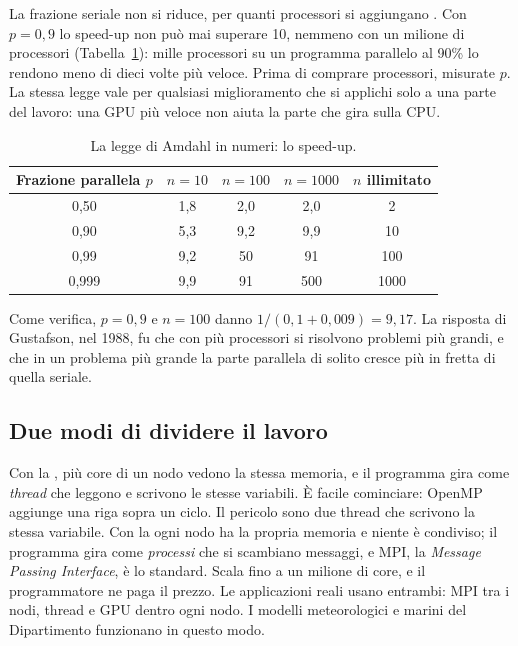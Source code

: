 \smallskip
La frazione seriale non si riduce, per quanti processori si aggiungano
\citep{amdahl1967}. Con $p=0,9$ lo speed-up non può mai superare 10, nemmeno
con un milione di processori (Tabella~\ref{tab:by:amdahl}): mille processori
su un programma parallelo al 90\% lo rendono meno di dieci volte più veloce.
Prima di comprare processori, misurate $p$. La stessa legge vale per qualsiasi
miglioramento che si applichi solo a una parte del lavoro: una GPU più veloce
non aiuta la parte che gira sulla CPU.

\begin{table}[htb]
\centering\small
\caption{La legge di Amdahl in numeri: lo speed-up.}\label{tab:by:amdahl}
\begin{tabular}{@{}ccccc@{}}
\toprule
\textbf{Frazione parallela $p$} & $n=10$ & $n=100$ & $n=1000$ & $n$ illimitato\\
\midrule
0,50 & 1,8 & 2,0 & 2,0 & 2\\
0,90 & 5,3 & 9,2 & 9,9 & 10\\
0,99 & 9,2 & 50 & 91 & 100\\
0,999 & 9,9 & 91 & 500 & 1000\\
\bottomrule
\end{tabular}
\end{table}

Come verifica, $p=0,9$ e $n=100$ danno $1/(0,1+0,009)=9,17$. La risposta di
Gustafson, nel 1988, fu che con più processori si risolvono problemi più
grandi, e che in un problema più grande la parte parallela di solito cresce
più in fretta di quella seriale.

\subsection{Due modi di dividere il lavoro}

Con la , più core di un nodo vedono la stessa memoria,
e il programma gira come \emph{thread} che leggono e scrivono le stesse
variabili. È facile cominciare: OpenMP aggiunge una riga sopra un ciclo. Il
pericolo sono due thread che scrivono la stessa variabile. Con la
 ogni nodo ha la propria memoria e niente è
condiviso; il programma gira come \emph{processi} che si scambiano messaggi, e
MPI, la \emph{Message Passing Interface}, è lo standard. Scala fino a un
milione di core, e il programmatore ne paga il prezzo. Le applicazioni reali
usano entrambi: MPI tra i nodi, thread e GPU dentro ogni nodo. I modelli
meteorologici e marini del Dipartimento funzionano in questo modo.

